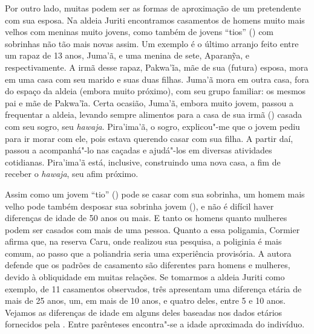 Por outro lado, muitas podem ser as formas de aproximação de um
pretendente com sua esposa. Na aldeia Juriti encontramos casamentos de
homens muito mais velhos com meninas muito jovens, como também de jovens
``tios'' () com sobrinhas não tão mais novas assim. Um exemplo é o
último arranjo feito entre um rapaz de 13 anos, Juma'ã, e uma menina de
sete, Aparanỹa,  e  respectivamente. A irmã desse rapaz, Pakwa'ĩa,
mãe de sua (futura) esposa, mora em uma casa com seu marido e suas duas
filhas. Juma'ã mora em outra casa, fora do espaço da aldeia (embora
muito próximo), com seu grupo familiar: os mesmos pai e mãe de Pakwa'ĩa.
Certa ocasião, Juma'ã, embora muito jovem, passou a frequentar a aldeia,
levando sempre alimentos para a casa de sua irmã () casada com seu
sogro, seu \emph{hawaja}. Pira'ima'ã, o sogro, explicou"-me que o jovem
pediu para ir morar com ele, pois estava querendo casar com sua filha. A
partir daí, passou a acompanhá"-lo nas caçadas e ajudá"-los em diversas
atividades cotidianas. Pira'ima'ã está, inclusive, construindo uma nova
casa, a fim de receber o \emph{hawaja}, seu afim próximo.

Assim como um jovem ``tio'' () pode se casar com sua sobrinha, um
homem mais velho pode também desposar sua sobrinha jovem (), e não é
difícil haver diferenças de idade de 50 anos ou mais. E tanto os homens
quanto mulheres podem ser casados com mais de uma pessoa. Quanto a essa
poligamia, Cormier afirma que, na reserva Caru, onde realizou sua
pesquisa, a poliginia é mais comum, ao passo que a poliandria seria uma
experiência provisória. A autora defende que os padrões de casamento são
diferentes para homens e mulheres, devido à obliquidade em muitas
relações. Se tomarmos a aldeia Juriti como exemplo, de 11 casamentos
observados, três apresentam uma diferença etária de mais de 25 anos, um,
em mais de 10 anos, e quatro deles, entre 5 e 10 anos. Vejamos as
diferenças de idade em alguns deles baseadas nos dados etários
fornecidos pela . Entre parênteses encontra"-se a idade aproximada
do indivíduo.


